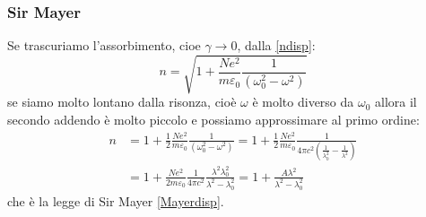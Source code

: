 \subsubsection{Sir Mayer}
Se trascuriamo l'assorbimento, cioe $\gamma\to 0$, dalla \eqref{ndisp}:
\begin{equation}
n=\sqrt{1+\frac{Ne^2}{m\varepsilon_0}\frac{1}{(\omega_0^2-\omega^2)}}
\end{equation}
se siamo molto lontano dalla risonza, cioè $\omega$ è molto diverso da $\omega_0$ allora il secondo addendo è molto piccolo e possiamo approssimare al primo ordine:
\begin{equation}
\begin{split}
n&=1+\frac{1}{2}\frac{Ne^2}{m\varepsilon_0}\frac{1}{(\omega_0^2-\omega^2)}=1+\frac{1}{2}\frac{Ne^2}{m\varepsilon_0}\frac{1}{4\pi c^2\left(\frac{1}{\lambda_0^2}-\frac{1}{\lambda^2}\right)}\\
&=1+\frac{Ne^2}{2m\varepsilon_0}\frac{1}{4\pi c^2}\frac{\lambda^2\lambda_0^2}{\lambda^2-\lambda_0^2}=1+\frac{A\lambda^2}{\lambda^2-\lambda_0^2}
\end{split}
\end{equation}
che è la legge di Sir Mayer \eqref{Mayerdisp}.
